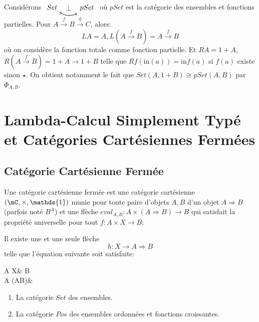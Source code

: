 \documentclass[math, info]{cours}
\begin{document}
\begin{exemple}
	Considérons $\begin{tikzcd}
		Set\ar[r, bend right] & pSet\ar[l, bend left]\ar[l, "\perp" description, phantom]
	\end{tikzcd}$
	où $pSet$ est la catégorie des ensembles et fonctions partielles.
	Pour $A \xrightarrow{f} B \xrightarrow{g} C$, alors:
	\begin{equation*}
		LA = A, L\left( A \xrightarrow{f} B \right) = A \xrightarrow{f} B
	\end{equation*}
	où on considère la fonction totale comme fonction partielle.
	Et $RA = 1 + A$, $R\left( A\xrightarrow{f} B \right) = 1 + A \to 1 + B$ telle que $Rf(\mathrm{in}(a)) = \mathrm{in}f(a)$ si $f(a)$ existe sinon $\star$.
	On obtient notamment le fait que $Set(A, 1 + B) \cong pSet(A, B)$ par $\Phi_{A, B}$.
\end{exemple}

\section{Lambda-Calcul Simplement Typé et Catégories Cartésiennes Fermées}
\subsection{Catégorie Cartésienne Fermée}
\begin{definition}
	Une catégorie cartésienne fermée est une catégorie cartésienne $\left( \mC, \times, \mathds{1} \right)$ munie pour toute paire d'objets $A, B$ d'un objet $A \Rightarrow B$ (parfois noté $B^{A}$) et une flèche $eval_{A, B}: A \times (A\Rightarrow B) \to B$
	qui satisfait la propriété universelle pour tout $f: A \times X \to B$:
	\begin{center}
		Il existe une et une seule flèche
		\begin{equation*}
			h: X \longrightarrow A \Rightarrow B
		\end{equation*}
		telle que l'équation suivante soit satisfaite:
		\begin{category}
			A \times X\ar[r, "f"]\ar[d, "\id_{A} \times h"'] & B\\
			A \times (A\rightarrow B)\ar[ur, "eval_{A, B}"']&
		\end{category}
	\end{center}
\end{definition}

\begin{exemple}
	\begin{enumerate}
		\item La catégorie $Set$ des ensembles.
		\item La catégorie $Pos$ des ensembles ordonnées et fonctions croissantes.
	\end{enumerate}
\end{exemple}
\end{document}
